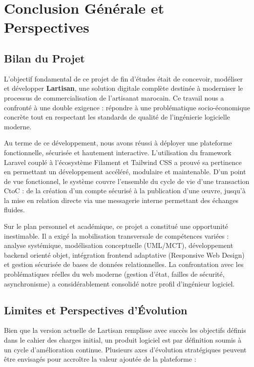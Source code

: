 \chapter*{Conclusion Générale et Perspectives}

\section*{Bilan du Projet}
L'objectif fondamental de ce projet de fin d'études était de concevoir, modéliser et développer \textbf{Lartisan}, une solution digitale complète destinée à moderniser le processus de commercialisation de l'artisanat marocain. Ce travail nous a confronté à une double exigence : répondre à une problématique socio-économique concrète tout en respectant les standards de qualité de l'ingénierie logicielle moderne.

Au terme de ce développement, nous avons réussi à déployer une plateforme fonctionnelle, sécurisée et hautement interactive. L'utilisation du framework Laravel couplé à l'écosystème Filament et Tailwind CSS a prouvé sa pertinence en permettant un développement accéléré, modulaire et maintenable. D'un point de vue fonctionnel, le système couvre l'ensemble du cycle de vie d'une transaction CtoC : de la création d'un compte sécurisé à la publication d'une œuvre, jusqu'à la mise en relation directe via une messagerie interne permettant des échanges fluides.

Sur le plan personnel et académique, ce projet a constitué une opportunité inestimable. Il a exigé la mobilisation transversale de compétences variées : analyse systémique, modélisation conceptuelle (UML/MCT), développement backend orienté objet, intégration frontend adaptative (Responsive Web Design) et gestion sécurisée de bases de données relationnelles. La confrontation avec les problématiques réelles du web moderne (gestion d'état, failles de sécurité, asynchronisme) a considérablement consolidé notre profil d'ingénieur logiciel.

\section*{Limites et Perspectives d'Évolution}
Bien que la version actuelle de Lartisan remplisse avec succès les objectifs définis dans le cahier des charges initial, un produit logiciel est par définition soumis à un cycle d'amélioration continue. Plusieurs axes d'évolution stratégiques peuvent être envisagés pour accroître la valeur ajoutée de la plateforme :


